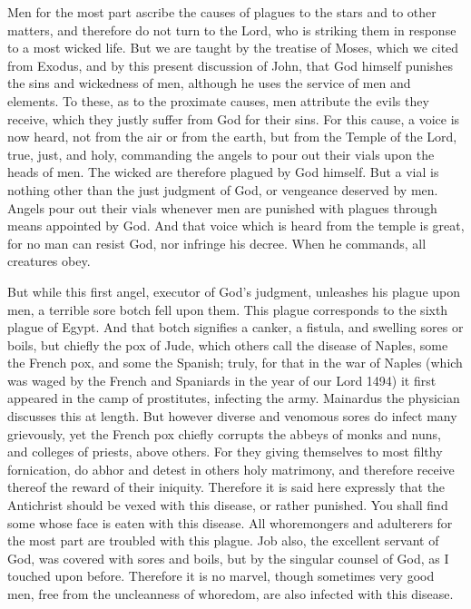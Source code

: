 Men for the most part ascribe the causes of plagues to the stars and to other matters, and therefore do not turn to the Lord, who is striking them in response to a most wicked life. But we are taught by the treatise of Moses, which we cited from Exodus, and by this present discussion of John, that God himself punishes the sins and wickedness of men, although he uses the service of men and elements. To these, as to the proximate causes, men attribute the evils they receive, which they justly suffer from God for their sins. For this cause, a voice is now heard, not from the air or from the earth, but from the Temple of the Lord, true, just, and holy, commanding the angels to pour out their vials upon the heads of men. The wicked are therefore plagued by God himself. But a vial is nothing other than the just judgment of God, or vengeance deserved by men. Angels pour out their vials whenever men are punished with plagues through means appointed by God. And that voice which is heard from the temple is great, for no man can resist God, nor infringe his decree. When he commands, all creatures obey.

But while this first angel, executor of God’s judgment, unleashes his plague upon men, a terrible sore botch fell upon them. This plague corresponds to the sixth plague of Egypt. And that botch signifies a canker, a fistula, and swelling sores or boils, but chiefly the pox of Jude, which others call the disease of Naples, some the French pox, and some the Spanish; truly, for that in the war of Naples (which was waged by the French and Spaniards in the year of our Lord 1494) it first appeared in the camp of prostitutes, infecting the army. Mainardus the physician discusses this at length. But however diverse and venomous sores do infect many grievously, yet the French pox chiefly corrupts the abbeys of monks and nuns, and colleges of priests, above others. For they giving themselves to most filthy fornication, do abhor and detest in others holy matrimony, and therefore receive thereof the reward of their iniquity. Therefore it is said here expressly that the Antichrist should be vexed with this disease, or rather punished. You shall find some whose face is eaten with this disease. All whoremongers and adulterers for the most part are troubled with this plague. Job also, the excellent servant of God, was covered with sores and boils, but by the singular counsel of God, as I touched upon before. Therefore it is no marvel, though sometimes very good men, free from the uncleanness of whoredom, are also infected with this disease.

